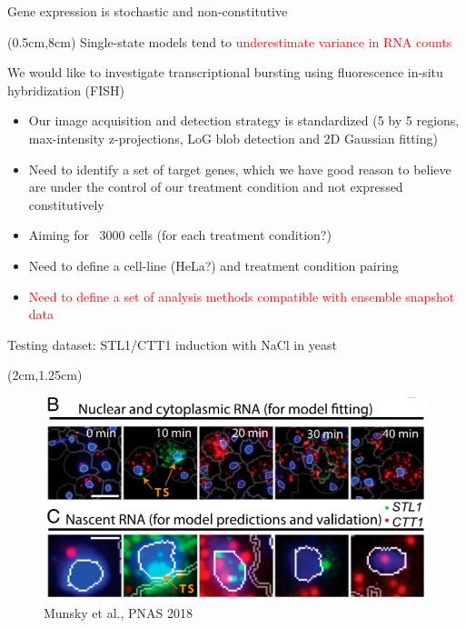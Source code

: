 \documentclass[aspectratio=1610]{beamer}					%
\begin{document}
\begin{frame}{Gene expression is stochastic and non-constitutive}
\begin{textblock*}{6cm}
\end{textblock*}

\begin{textblock*}{15cm}(0.5cm,8cm)
Single-state models tend to \textcolor{red}{underestimate variance in RNA counts}
\end{textblock*}


\end{frame}

\begin{frame}

We would like to investigate transcriptional bursting using fluorescence in-situ hybridization (FISH)\\
\vspace{0.2in}

\begin{itemize}
\item Our image acquisition and detection strategy is standardized (5 by 5 regions, max-intensity z-projections, LoG blob detection and 2D Gaussian fitting)
\item Need to identify a set of target genes, which we have good reason to believe are under the control of our treatment condition and not expressed constitutively
\item Aiming for ~3000 cells (for each treatment condition?)
\item Need to define a cell-line (HeLa?) and treatment condition pairing
\item \textcolor{red}{Need to define a set of analysis methods compatible with ensemble snapshot data}
\end{itemize}

\end{frame}

\begin{frame}{Testing dataset:  STL1/CTT1 induction with NaCl in yeast}
\begin{textblock*}{12cm}(2cm,1.25cm)
\begin{figure}
\includegraphics[width=12cm]{salt.png}
\caption{Munsky et al., PNAS 2018}
\end{figure}
\end{textblock*}
\end{frame}
\end{document}
